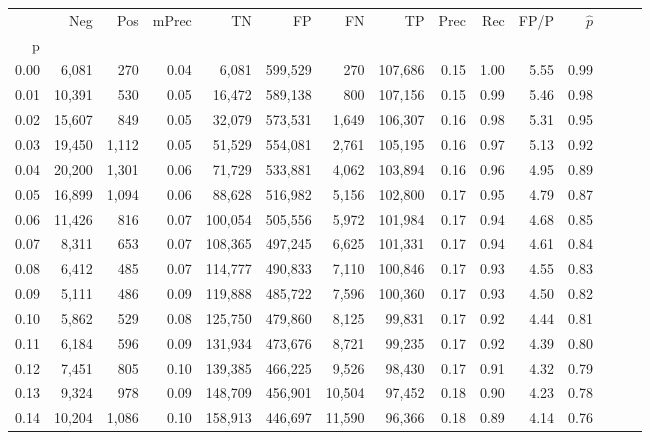 \begin{tabular}{rrrrrrrrrrrrrrr}
\toprule
{} &     Neg &    Pos & mPrec &       TN &       FP &       FN &       TP &  Prec &   Rec &  FP/P & $\hat{p}$ \\
p    &         &        &       &          &          &          &          &       &       &       &           \\
\midrule
0.00 &   6,081 &    270 &  0.04 &    6,081 &  599,529 &      270 &  107,686 &  0.15 &  1.00 &  5.55 &      0.99 \\
0.01 &  10,391 &    530 &  0.05 &   16,472 &  589,138 &      800 &  107,156 &  0.15 &  0.99 &  5.46 &      0.98 \\
0.02 &  15,607 &    849 &  0.05 &   32,079 &  573,531 &    1,649 &  106,307 &  0.16 &  0.98 &  5.31 &      0.95 \\
0.03 &  19,450 &  1,112 &  0.05 &   51,529 &  554,081 &    2,761 &  105,195 &  0.16 &  0.97 &  5.13 &      0.92 \\
0.04 &  20,200 &  1,301 &  0.06 &   71,729 &  533,881 &    4,062 &  103,894 &  0.16 &  0.96 &  4.95 &      0.89 \\
0.05 &  16,899 &  1,094 &  0.06 &   88,628 &  516,982 &    5,156 &  102,800 &  0.17 &  0.95 &  4.79 &      0.87 \\
0.06 &  11,426 &    816 &  0.07 &  100,054 &  505,556 &    5,972 &  101,984 &  0.17 &  0.94 &  4.68 &      0.85 \\
0.07 &   8,311 &    653 &  0.07 &  108,365 &  497,245 &    6,625 &  101,331 &  0.17 &  0.94 &  4.61 &      0.84 \\
0.08 &   6,412 &    485 &  0.07 &  114,777 &  490,833 &    7,110 &  100,846 &  0.17 &  0.93 &  4.55 &      0.83 \\
0.09 &   5,111 &    486 &  0.09 &  119,888 &  485,722 &    7,596 &  100,360 &  0.17 &  0.93 &  4.50 &      0.82 \\
0.10 &   5,862 &    529 &  0.08 &  125,750 &  479,860 &    8,125 &   99,831 &  0.17 &  0.92 &  4.44 &      0.81 \\
0.11 &   6,184 &    596 &  0.09 &  131,934 &  473,676 &    8,721 &   99,235 &  0.17 &  0.92 &  4.39 &      0.80 \\
0.12 &   7,451 &    805 &  0.10 &  139,385 &  466,225 &    9,526 &   98,430 &  0.17 &  0.91 &  4.32 &      0.79 \\
0.13 &   9,324 &    978 &  0.09 &  148,709 &  456,901 &   10,504 &   97,452 &  0.18 &  0.90 &  4.23 &      0.78 \\
0.14 &  10,204 &  1,086 &  0.10 &  158,913 &  446,697 &   11,590 &   96,366 &  0.18 &  0.89 &  4.14 &      0.76 \\

\end{tabular}
